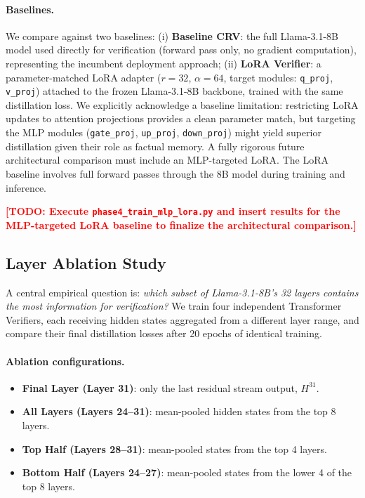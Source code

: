 \documentclass{article}
\begin{document}
\paragraph{Baselines.} We compare against two baselines: (i) \textbf{Baseline CRV}: the full Llama-3.1-8B model used directly for verification (forward pass only, no gradient computation), representing the incumbent deployment approach; (ii) \textbf{LoRA Verifier}: a parameter-matched LoRA adapter ($r=32$, $\alpha=64$, target modules: \texttt{q\_proj}, \texttt{v\_proj}) attached to the frozen Llama-3.1-8B backbone, trained with the same distillation loss. We explicitly acknowledge a baseline limitation: restricting LoRA updates to attention projections provides a clean parameter match, but targeting the MLP modules (\texttt{gate\_proj}, \texttt{up\_proj}, \texttt{down\_proj}) might yield superior distillation given their role as factual memory. A fully rigorous future architectural comparison must include an MLP-targeted LoRA. The LoRA baseline involves full forward passes through the 8B model during training and inference.

\textcolor{red}{\textbf{[TODO: Execute \texttt{phase4\_train\_mlp\_lora.py} and insert results for the MLP-targeted LoRA baseline to finalize the architectural comparison.]}}

\subsection{Layer Ablation Study}
\label{sec:ablation}

A central empirical question is: \emph{which subset of Llama-3.1-8B's 32 layers contains the most information for verification?} We train four independent Transformer Verifiers, each receiving hidden states aggregated from a different layer range, and compare their final distillation losses after 20 epochs of identical training.

\paragraph{Ablation configurations.}
\begin{itemize}[topsep=2pt, itemsep=1pt]
  \item \textbf{Final Layer (Layer 31)}: only the last residual stream output, $H^{31}$.
  \item \textbf{All Layers (Layers 24--31)}: mean-pooled hidden states from the top 8 layers.
  \item \textbf{Top Half (Layers 28--31)}: mean-pooled states from the top 4 layers.
  \item \textbf{Bottom Half (Layers 24--27)}: mean-pooled states from the lower 4 of the top 8 layers.
\end{itemize}
\end{document}
